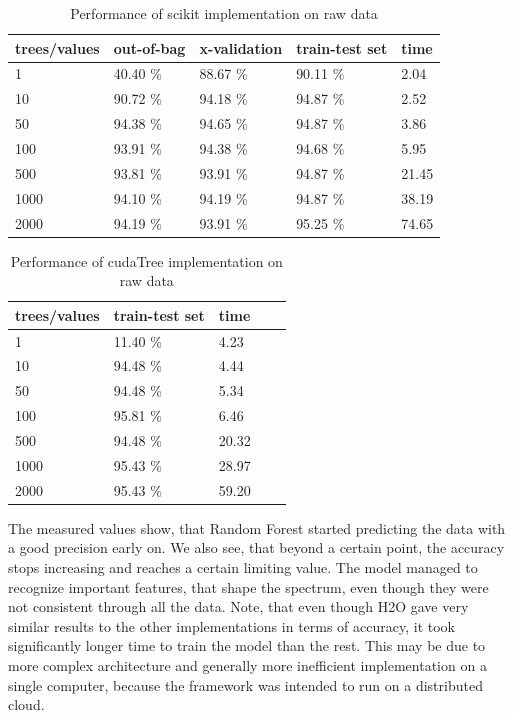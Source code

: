 \documentclass[thesis=B,english]{FITthesis}[2012/10/20]
\begin{document}
\begin{table}[h]
\begin{tabular}{|l|l|l|l|l|}
\hline
trees/values & out-of-bag & x-validation & train-test set & time \\ \hline
1            &40.40 \%           &88.67 \%              &90.11 \%                & 2.04          \\ \hline
10           &90.72 \%           &94.18 \%              &94.87 \%                &2.52           \\ \hline
50           &94.38 \%           &94.65 \%              &94.87 \%                &3.86        \\ \hline
100          &93.91 \%           &94.38 \%              &94.68 \%                &5.95        \\ \hline
500          &93.81 \%           &93.91 \%              &94.87 \%                &21.45      \\ \hline
1000         &94.10 \%           &94.19 \%              &94.87 \%                &38.19         \\ \hline
2000         &94.19 \%           &93.91 \%              &95.25 \%                &74.65        \\ \hline
\end{tabular}
\caption{Performance of scikit implementation on raw data}
\label{my-label}
\end{table}
\begin{table}[h]
\begin{tabular}{|l|l|l|l|l|}
\hline
trees/values & train-test set & time \\ \hline
1            & 11.40 \%              & 4.23      \\ \hline
10           & 94.48 \%              & 4.44      \\ \hline
50           & 94.48 \%              & 5.34      \\ \hline
100          & 95.81 \%              & 6.46      \\ \hline
500          & 94.48 \%              & 20.32     \\ \hline
1000         & 95.43 \%              & 28.97     \\ \hline
2000         & 95.43 \%              & 59.20     \\ \hline
\end{tabular}
\caption{Performance of cudaTree implementation on raw data}
\label{my-label}
\end{table}

The measured values show, that Random Forest started predicting the data with a good precision early on. We also see, that beyond a certain point, the accuracy stops increasing and reaches a certain limiting value. The model managed to recognize important features, that shape the spectrum, even though they were not consistent through all the data. Note, that even though H2O gave very similar results to the other implementations in terms of accuracy, it took significantly longer time to train the model than the rest. This may be due to more complex architecture and generally more inefficient implementation on a single computer, because the framework was intended to run on a distributed cloud. 
\end{document}
